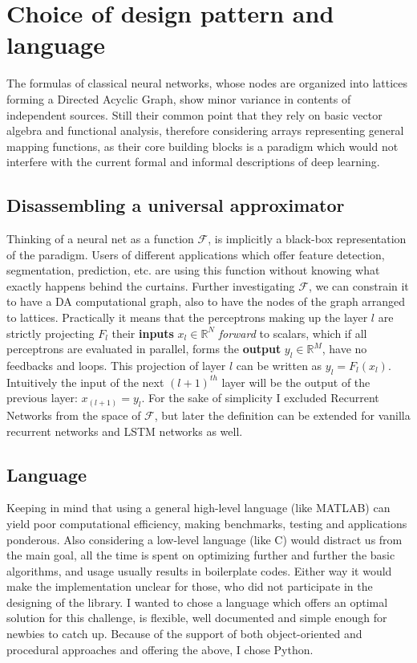 \section{Choice of design pattern and language}

The formulas of classical neural networks, whose nodes are organized into
 lattices forming a Directed Acyclic Graph, show minor variance in
 contents of independent sources. Still their common point that they rely
 on basic vector algebra and functional analysis, therefore considering
 arrays representing general mapping functions, as their core building
 blocks is a paradigm which would not interfere with the current formal
 and informal descriptions of deep learning.

\subsection{Disassembling a universal approximator}
Thinking of a neural net as a function \(\mathcal{F}\), is implicitly a black-box representation of the paradigm.
Users of different applications which offer feature detection, segmentation, prediction, etc. are using this function without knowing what exactly happens behind the curtains. 
Further investigating $\mathcal{F}$, we can constrain it to have a DA computational graph, also to have the nodes of the graph arranged to lattices.
Practically it means that the perceptrons making up the layer \(l\) are strictly projecting $F_l$ their \textbf{inputs} 
$ x_l \in \mathbb{R}^N $ \emph{forward} to scalars, which if all perceptrons are evaluated in parallel, forms the 
\textbf{output} $y_l \in \mathbb{R}^M$, have no feedbacks and loops. 
This projection of layer $l$ can be written as $y_l = F_l(x_l)$. 
Intuitively the input of the next $(l+1)^{th}$ layer will be the output of the previous layer:
$x_{(l+1)} = y_l$.
For the sake of simplicity I excluded Recurrent Networks from the space of $\mathcal{F}$, but later the definition can be extended for vanilla recurrent networks and LSTM networks as well.

\subsection{Language} Keeping in mind that using a general high-level language (like MATLAB) can yield poor computational efficiency, making benchmarks, testing and applications ponderous.
Also considering a low-level language (like C) 
would distract us from the main goal, all 
the time is spent on optimizing further and 
further the basic algorithms, and usage usually 
results in boilerplate codes. 
Either way it would make the implementation unclear for those, who did not participate in the designing of the library.
I wanted to chose a language which offers an optimal solution for this challenge, is flexible, well documented and simple enough for newbies to catch up.
Because of the support of both object-oriented and procedural approaches and offering the above, I chose Python.

